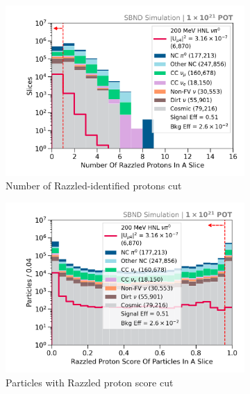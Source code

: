 \begin{figure}[ht!]
        \begin{subfigure}[b]{0.495\textwidth}   
            \centering 
            \includegraphics[width=\textwidth]{nrazzled_proton_precut}
            \caption{Number of Razzled-identified protons cut}%
            \label{fig:nrazzled_proton_full}
        \end{subfigure}
        \hfill
        \begin{subfigure}[b]{0.495\textwidth}   
            \centering 
            \includegraphics[width=\textwidth]{razzled_proton_score_precut}
            \caption{Particles with Razzled proton score cut}%
            \label{fig:razzled_proton_score_full}
        \end{subfigure}
        \hfill
        \begin{subfigure}[b]{0.495\textwidth}   

\end{subfigure}
\end{figure}
